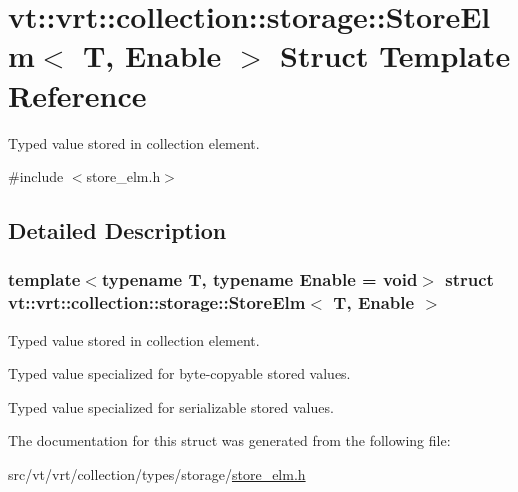 \hypertarget{structvt_1_1vrt_1_1collection_1_1storage_1_1_store_elm}{}\section{vt\+:\+:vrt\+:\+:collection\+:\+:storage\+:\+:Store\+Elm$<$ T, Enable $>$ Struct Template Reference}
\label{structvt_1_1vrt_1_1collection_1_1storage_1_1_store_elm}


Typed value stored in collection element.  




{\ttfamily \#include $<$store\+\_\+elm.\+h$>$}



\subsection{Detailed Description}
\subsubsection*{template$<$typename T, typename Enable = void$>$\newline
struct vt\+::vrt\+::collection\+::storage\+::\+Store\+Elm$<$ T, Enable $>$}

Typed value stored in collection element. 

Typed value specialized for byte-\/copyable stored values.

Typed value specialized for serializable stored values. 

The documentation for this struct was generated from the following file\+:\begin{DoxyCompactItemize}
\item 
src/vt/vrt/collection/types/storage/\hyperlink{store__elm_8h}{store\+\_\+elm.\+h}\end{DoxyCompactItemize}
